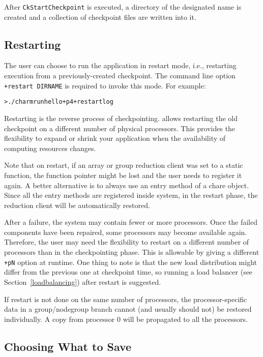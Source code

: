 After {\tt CkStartCheckpoint} is executed, a directory of the
designated name is created and a collection of checkpoint files are
written into it.

\subsection{Restarting}

The user can choose to run the \charmpp{} application in restart mode,
i.e., restarting execution from a previously-created checkpoint. The
command line option {\tt +restart DIRNAME} is required to invoke this
mode. For example:

\begin{alltt}
  > ./charmrun hello +p4 +restart log
\end{alltt}

Restarting is the reverse process of checkpointing. \charmpp{} allows
restarting the old checkpoint on a different number of physical
processors.  This provides the flexibility to expand or shrink your
application when the availability of computing resources changes.

Note that on restart, if an array or group reduction client was set to a static
function, the function pointer might be lost and the user needs to
register it again. A better alternative is to always use an entry method
of a chare object. Since all the entry methods are registered
inside \charmpp{} system, in the restart phase, the reduction client
will be automatically restored.

After a failure, the system may contain fewer or more
processors. Once the failed components have been repaired, some
processors may become available again. Therefore, the user may need
the flexibility to restart on a different number of processors than in
the checkpointing phase. This is allowable by giving a different {\tt
+pN} option at runtime. One thing to note is that the new load
distribution might differ from the previous one at checkpoint time, so
running a load balancer (see Section~\ref{loadbalancing}) after
restart is suggested.

If restart is not done on the same number of processors, the
processor-specific data in a group/nodegroup branch cannot (and
usually should not) be restored individually. A copy from processor 0
will be propagated to all the processors.

\subsection{Choosing What to Save}


